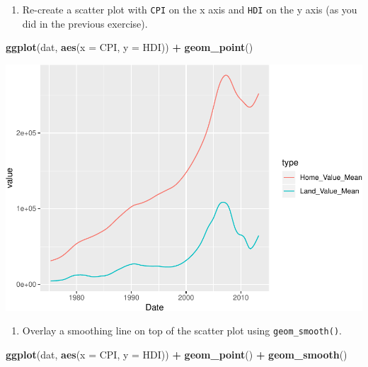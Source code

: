 \documentclass[
]{book}
\newenvironment{Shaded}{\begin{snugshade}}{\end{snugshade}}
\newcommand{\DataTypeTok}[1]{\textcolor[rgb]{0.13,0.29,0.53}{#1}}
\newcommand{\KeywordTok}[1]{\textcolor[rgb]{0.13,0.29,0.53}{\textbf{#1}}}
\newcommand{\NormalTok}[1]{#1}
\newcommand{\OperatorTok}[1]{\textcolor[rgb]{0.81,0.36,0.00}{\textbf{#1}}}
\newcommand{\StringTok}[1]{\textcolor[rgb]{0.31,0.60,0.02}{#1}}
\providecommand{\tightlist}{%
  \setlength{\itemsep}{0pt}\setlength{\parskip}{0pt}}
\begin{document}
\begin{alert}

\begin{enumerate}
\def\labelenumi{\arabic{enumi}.}
\tightlist
\item
  Re-create a scatter plot with \texttt{CPI} on the x axis and \texttt{HDI} on the y axis (as you did in the previous exercise).
\end{enumerate}

\begin{Shaded}
\begin{Highlighting}[]
\KeywordTok{ggplot}\NormalTok{(dat, }\KeywordTok{aes}\NormalTok{(}\DataTypeTok{x =}\NormalTok{ CPI, }\DataTypeTok{y =}\NormalTok{ HDI)) }\OperatorTok{+}
\StringTok{  }\KeywordTok{geom\_point}\NormalTok{()}
\end{Highlighting}
\end{Shaded}

\includegraphics{R/Rgraphics/figures/unnamed-chunk-189-1.pdf}

\begin{enumerate}
\def\labelenumi{\arabic{enumi}.}
\setcounter{enumi}{1}
\tightlist
\item
  Overlay a smoothing line on top of the scatter plot using \texttt{geom\_smooth()}.
\end{enumerate}

\begin{Shaded}
\begin{Highlighting}[]
\KeywordTok{ggplot}\NormalTok{(dat, }\KeywordTok{aes}\NormalTok{(}\DataTypeTok{x =}\NormalTok{ CPI, }\DataTypeTok{y =}\NormalTok{ HDI)) }\OperatorTok{+}
\StringTok{  }\KeywordTok{geom\_point}\NormalTok{() }\OperatorTok{+}
\StringTok{  }\KeywordTok{geom\_smooth}\NormalTok{()}
\end{Highlighting}
\end{Shaded}


\end{alert}
\end{document}
